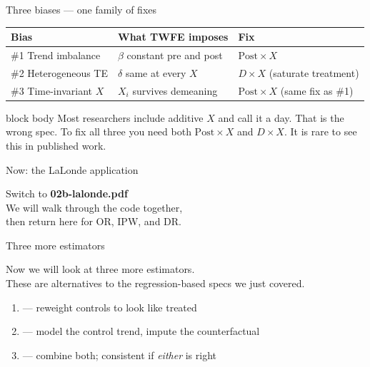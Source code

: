 \documentclass[aspectratio=169,11pt]{beamer}
\newcommand{\emphbox}[1]{%
  \begin{beamercolorbox}[rounded=true,sep=7pt,wd=\linewidth]{block body}%
    \small\color{slate} #1%
  \end{beamercolorbox}}
\begin{document}

\begin{frame}{Three biases --- one family of fixes}
\vspace{0.3em}
{\small
\begin{tabular}{@{}lll@{}}
\toprule
\textbf{Bias} & \textbf{What TWFE imposes} & \textbf{Fix} \\
\midrule
\#1 Trend imbalance
  & $\beta$ constant pre and post
  & $\mathrm{Post}\times X$ \\[4pt]
\#2 Heterogeneous TE
  & $\delta$ same at every $X$
  & $D\times X$ (saturate treatment) \\[4pt]
\#3 Time-invariant $X$
  & $X_i$ survives demeaning
  & $\mathrm{Post}\times X$ (same fix as \#1) \\
\bottomrule
\end{tabular}
}
\vspace{0.5em}
\emphbox{Most researchers include additive $X$ and call it a day. That is the wrong spec.
To fix all three you need both $\mathrm{Post}\times X$ and $D\times X$.
It is rare to see this in published work.}
\end{frame}

\begin{frame}{Now: the LaLonde application}
\vspace{1.2em}
\begin{center}
\Large
Switch to \textbf{02b-lalonde.pdf}\\[0.8em]
\color{warmgray}\normalsize
We will walk through the code together,\\
then return here for OR, IPW, and DR.
\end{center}
\end{frame}


\begin{frame}{Three more estimators}
\vspace{0.8em}
\begin{center}
Now we will look at three more estimators.\\[0.5em]
These are alternatives to the regression-based specs we just covered.
\end{center}
\vspace{0.6em}
\begin{enumerate}\setlength\itemsep{0.5em}
  \item {} --- reweight controls to look like treated
  \item {} --- model the control trend, impute the counterfactual
  \item {} --- combine both; consistent if \textit{either} is right
\end{enumerate}
\end{frame}
\end{document}
